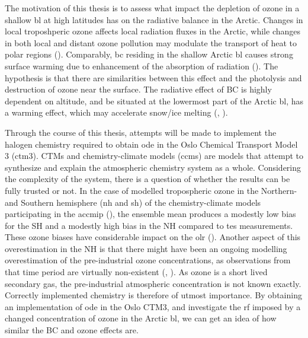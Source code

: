 \medskip

The motivation of this thesis is to assess what impact the depletion of ozone in a shallow \acrshort{bl} at high latitudes has on the radiative balance in the Arctic. Changes in local troposhperic ozone affects local radiation fluxes in the Arctic, while changes in both local and distant ozone pollution may modulate the transport of heat to polar regions (\cite{Shindell2007}). Comparably, \acrfull{bc} residing in the shallow Arctic \acrshort{bl} causes strong surface warming due to enhancement of the absorption of radiation (\cite{Flanner2013}). The hypothesis is that there are similarities between this effect and the photolysis and destruction of ozone near the surface. The radiative effect of BC is highly dependent on altitude, and \acrfull{be} situated at the lowermost part of the Arctic \acrshort{bl}, has a warming effect, which may accelerate snow/ice melting (\cite{Flanner2013}, \cite{AMAP2015}). 

\medskip

Through the course of this thesis, attempts will be made to implement the halogen chemistry required to obtain \acrshort{ode} in the Oslo Chemical Transport Model 3 (\acrshort{ctm}3). CTMs and chemistry-climate models (\acrshort{ccm}s) are models that attempt to synthesize and explain the atmospheric chemistry system as a whole. Considering the complexity of the system, there is a question of whether the results can be fully trusted or not. In the case of modelled tropospheric ozone in the Northern- and Southern hemisphere (\acrshort{nh} and \acrshort{sh}) of the chemistry-climate models participating in the \acrfull{accmip} (\cite{Bowman2013}), the ensemble mean produces a modestly low bias for the SH and a modestly high bias in the NH compared to \acrfull{tes} measurements. These ozone biases have considerable impact on the \acrfull{olr} (\cite{Bowman2013}). Another aspect of this overestimation in the NH is that there might have been an ongoing modelling overestimation of the pre-industrial ozone concentrations, as observations from that time period are virtually non-existent (\cite{shindell2003}, \cite{Parrish2014}). As ozone is a short lived secondary gas, the pre-industrial atmospheric concentration is not known exactly. Correctly implemented chemistry is therefore of utmost importance. By obtaining an implementation of \acrshort{ode} in the Oslo CTM3, and investigate the \acrshort{rf} imposed by a changed concentration of ozone in the Arctic \acrshort{bl}, we can get an idea of how similar the BC and ozone effects are. 


